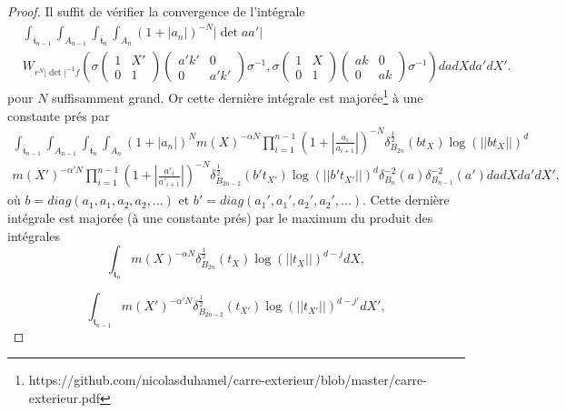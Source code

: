 \documentclass{amsart}
\begin{document}
\begin{proof}
Il suffit de vérifier la convergence de l'intégrale
\begin{equation}
\begin{split}
&\int_{\bar{\mathfrak{t}}_{n-1}} \int_{A_{n-1}} \int_{\bar{\mathfrak{t}}_n} \int_{A_n} (1+|a_n|)^{-N} |\det aa'| \\
& W_{r^N |\det|^{-1}f}\left(\sigma \begin{pmatrix}
1 & X' \\
0 & 1
\end{pmatrix} \begin{pmatrix}
a'k' & 0 \\
0 & a'k'
\end{pmatrix} \sigma^{-1}, \sigma \begin{pmatrix}
1 & X \\
0 & 1
\end{pmatrix} \begin{pmatrix}
ak & 0 \\
0 & ak
\end{pmatrix} \sigma^{-1}\right) da dX da' dX'.
\end{split}
\end{equation}
pour $N$ suffisamment grand. Or cette dernière intégrale est majorée\footnote{https://github.com/nicolasduhamel/carre-exterieur/blob/master/carre-exterieur.pdf} à une constante prés par
\begin{equation}
\begin{split}
\int_{\bar{\mathfrak{t}}_{n-1}} \int_{A_{n-1}} \int_{\bar{\mathfrak{t}}_n} \int_{A_n} (1+|a_n|)^N m(X)^{-\alpha N} \prod_{i=1}^{n-1} (1 + |\frac{a_i}{a_{i+1}}|)^{-N} \delta^{\frac{1}{2}}_{B_{2n}}(bt_X)\log(||bt_X||)^d \\
m(X')^{-\alpha' N} \prod_{i=1}^{n-1} (1 + |\frac{a'_i}{a'_{i+1}}|)^{-N} \delta^{\frac{1}{2}}_{B_{2n-2}}(b't_{X'})\log(||b't_{X'}||)^d \delta_{B_n}^{-2}(a) \delta_{B_{n-1}}^{-2}(a') da dX da' dX',
\end{split}
\end{equation}
où $b = diag(a_1, a_1, a_2, a_2, ...)$ et $b' = diag(a_1', a_1', a_2', a_2', ...)$. Cette dernière intégrale est majorée (à une constante prés) par le maximum du produit des intégrales
 \begin{equation}
 \int_{\bar{\mathfrak{t}}_n} m(X)^{-\alpha N} \delta^{\frac{1}{2}}_{B_{2n}}(t_X)\log(||t_X||)^{d-j} dX,
 \end{equation}
 
 \begin{equation}
 \int_{\bar{\mathfrak{t}}_{n-1}} m(X')^{-\alpha' N} \delta^{\frac{1}{2}}_{B_{2n-2}}(t_{X'})\log(||t_{X'}||)^{d-j'} dX',
 \end{equation}
 

\end{proof}
\end{document}
